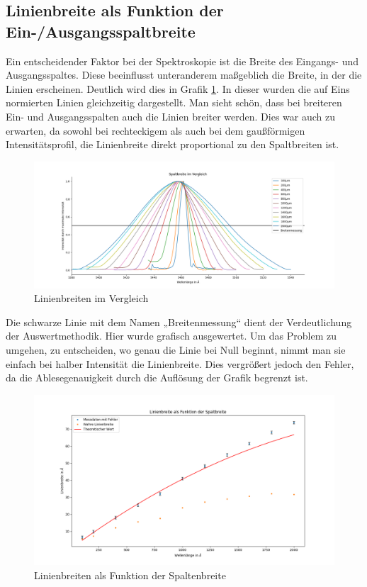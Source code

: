 \subsection{Linienbreite als Funktion der Ein-/Ausgangsspaltbreite}

Ein entscheidender Faktor bei der Spektroskopie ist die Breite des Eingangs- und Ausgangsspaltes. Diese beeinflusst unteranderem maßgeblich die Breite, 
in der die Linien erscheinen. Deutlich wird dies in Grafik \ref{LinVergleich}. In dieser wurden die auf Eins normierten Linien gleichzeitig dargestellt. 
Man sieht schön, dass bei breiteren Ein- und Ausgangsspalten auch die Linien breiter werden. Dies war auch zu erwarten, da sowohl bei rechteckigem als auch bei 
dem gaußförmigen Intensitätsprofil, die Linienbreite direkt proportional zu den Spaltbreiten ist.
\begin{figure}[h]
    \centering
    \includegraphics[width = \linewidth]{Bilder/LinienbreiteVergleich.png}
    \caption{Linienbreiten im Vergleich}
    \label{LinVergleich}
\end{figure}
Die schwarze Linie mit dem Namen „Breitenmessung“ dient der Verdeutlichung der Auswertmethodik. Hier wurde grafisch ausgewertet. Um das Problem zu umgehen, 
zu entscheiden, wo genau die Linie bei Null beginnt, nimmt man sie einfach bei halber Intensität die Linienbreite. 
Dies vergrößert jedoch den Fehler, da die Ablesegenauigkeit durch die Auflösung der Grafik begrenzt ist.

\begin{figure}[h]
    \centering
    \includegraphics[width = \linewidth]{Bilder/Spaltbreite_Linie.png}
    \caption{Linienbreiten als Funktion der Spaltenbreite}
    \label{RealLin}
\end{figure}